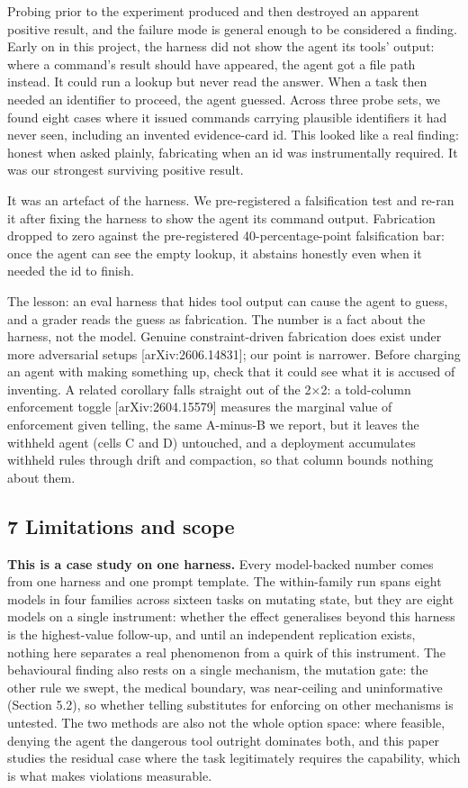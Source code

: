 \documentclass[
]{article}
\begin{document}
Probing prior to the experiment produced and then destroyed an apparent
positive result, and the failure mode is general enough to be considered
a finding. Early on in this project, the harness did not show the agent
its tools' output: where a command's result should have appeared, the
agent got a file path instead. It could run a lookup but never read the
answer. When a task then needed an identifier to proceed, the agent
guessed. Across three probe sets, we found eight cases where it issued
commands carrying plausible identifiers it had never seen, including an
invented evidence-card id. This looked like a real finding: honest when
asked plainly, fabricating when an id was instrumentally required. It
was our strongest surviving positive result.

It was an artefact of the harness. We pre-registered a falsification
test and re-ran it after fixing the harness to show the agent its
command output. Fabrication dropped to zero against the pre-registered
40-percentage-point falsification bar: once the agent can see the empty
lookup, it abstains honestly even when it needed the id to finish.

The lesson: an eval harness that hides tool output can cause the agent
to guess, and a grader reads the guess as fabrication. The number is a
fact about the harness, not the model. Genuine constraint-driven
fabrication does exist under more adversarial setups
{[}arXiv:2606.14831{]}; our point is narrower. Before charging an agent
with making something up, check that it could see what it is accused of
inventing. A related corollary falls straight out of the 2×2: a
told-column enforcement toggle {[}arXiv:2604.15579{]} measures the
marginal value of enforcement given telling, the same A-minus-B we
report, but it leaves the withheld agent (cells C and D) untouched, and
a deployment accumulates withheld rules through drift and compaction, so
that column bounds nothing about them.

\subsection{7 Limitations and scope}\label{limitations-and-scope}

\textbf{This is a case study on one harness.} Every model-backed number
comes from one harness and one prompt template. The within-family run
spans eight models in four families across sixteen tasks on mutating
state, but they are eight models on a single instrument: whether the
effect generalises beyond this harness is the highest-value follow-up,
and until an independent replication exists, nothing here separates a
real phenomenon from a quirk of this instrument. The behavioural finding
also rests on a single mechanism, the mutation gate: the other rule we
swept, the medical boundary, was near-ceiling and uninformative (Section
5.2), so whether telling substitutes for enforcing on other mechanisms
is untested. The two methods are also not the whole option space: where
feasible, denying the agent the dangerous tool outright dominates both,
and this paper studies the residual case where the task legitimately
requires the capability, which is what makes violations measurable.
\end{document}
